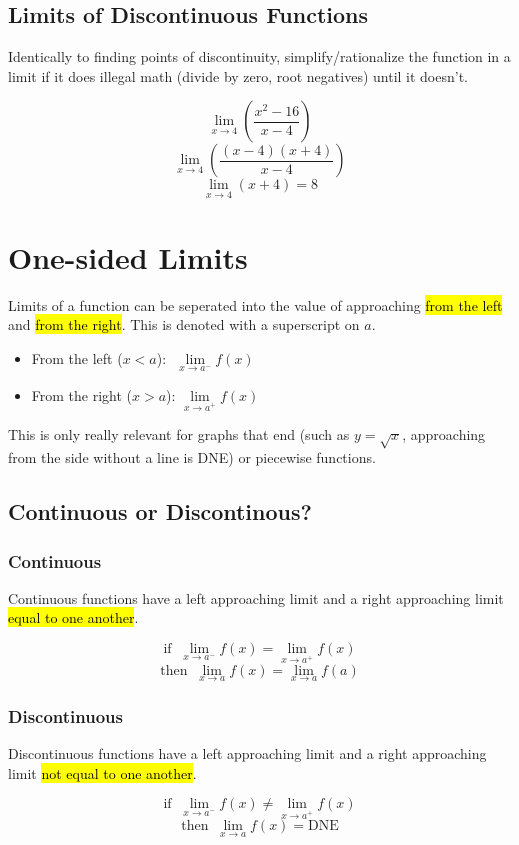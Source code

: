 \documentclass[a4paper,12pt]{article}
\begin{document}
\subsection{Limits of Discontinuous Functions}
Identically to finding points of discontinuity, simplify/rationalize the function in a limit if it does illegal math (divide by zero, root negatives) until it doesn't.

$$\lim\limits_{x \to 4}(\frac{x^2 - 16}{x - 4})$$
$$\lim\limits_{x \to 4}(\frac{(x - 4)(x + 4)}{x - 4})$$
$$\lim\limits_{x \to 4}(x + 4) = 8$$

\section{One-sided Limits}
Limits of a function can be seperated into the value of approaching \hl{from the left} and \hl{from the right}. This is denoted with a superscript on $a$.
\begin{itemize}
    \item{From the left ($x < a$): \;\,\,$\lim\limits_{x \to a^-} f(x)$}
    \item{From the right ($x > a$): $\lim\limits_{x \to a^+} f(x)$}
\end{itemize}

This is only really relevant for graphs that end (such as $y = \sqrt{x}$, approaching from the side without a line is DNE) or piecewise functions.

\subsection{Continuous or Discontinous?}
\subsubsection{Continuous}
Continuous functions have a left approaching limit and a right approaching limit \hl{equal to one another}.

$$\textrm{if}\;\; \lim\limits_{x \to a^-} f(x) = \lim\limits_{x \to a^+} f(x)$$
$$\textrm{then}\;\; \lim\limits_{x \to a} f(x) = \lim\limits_{x \to a} f(a)$$

\subsubsection{Discontinuous}
Discontinuous functions have a left approaching limit and a right approaching limit \hl{not equal to one another}.

$$\textrm{if}\;\; \lim\limits_{x \to a^-} f(x) \neq \lim\limits_{x \to a^+} f(x)$$
$$\textrm{then}\;\; \lim\limits_{x \to a} f(x) = \textrm{DNE}$$
\end{document}
